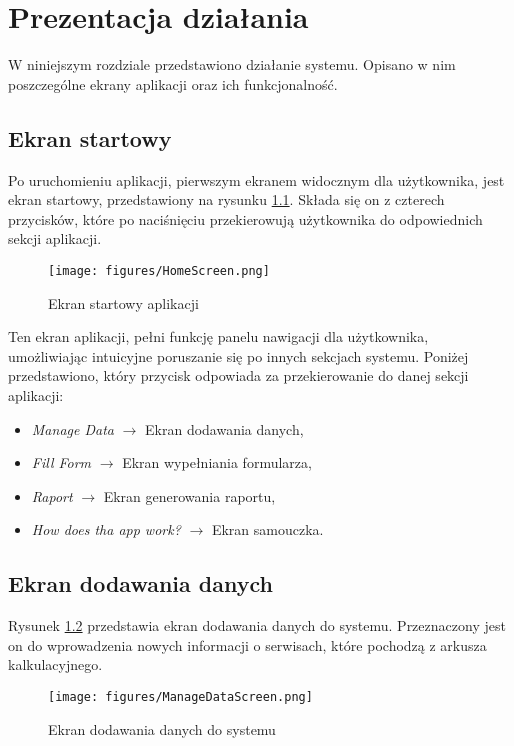 \chapter{Prezentacja działania}

W niniejszym rozdziale przedstawiono działanie systemu. Opisano w nim poszczególne ekrany aplikacji oraz ich funkcjonalność. 

\section{Ekran startowy}
Po uruchomieniu aplikacji, pierwszym ekranem widocznym dla użytkownika, jest ekran startowy, przedstawiony na rysunku \ref{fig:homescreen}. Składa się on z czterech przycisków, które po naciśnięciu przekierowują użytkownika do odpowiednich sekcji aplikacji.

 \begin{figure}[h]
     \centering
     \texttt{[image: figures/HomeScreen.png]}
     \caption{Ekran startowy aplikacji} 
     \label{fig:homescreen}
 \end{figure}

 Ten ekran aplikacji, pełni funkcję panelu nawigacji dla użytkownika, umożliwiając intuicyjne poruszanie się po innych sekcjach systemu.
Poniżej przedstawiono, który przycisk odpowiada za przekierowanie do danej sekcji aplikacji:
\begin{itemize}
    \item \emph{Manage Data} $\rightarrow$ Ekran dodawania danych,
    \item \emph{Fill Form} $\rightarrow$ Ekran wypełniania formularza,
    \item \emph{Raport} $\rightarrow$ Ekran generowania raportu,
    \item \emph{How does tha app work?} $\rightarrow$ Ekran samouczka.
\end{itemize}


 \section{Ekran dodawania danych}
 Rysunek \ref{fig:managedatascreen} przedstawia ekran dodawania danych do systemu. Przeznaczony jest on do wprowadzenia nowych informacji o serwisach, które pochodzą z arkusza kalkulacyjnego.
  \begin{figure}[H]
     \centering
     \texttt{[image: figures/ManageDataScreen.png]}
     \caption{Ekran dodawania danych do systemu} 
     \label{fig:managedatascreen}
 \end{figure}

